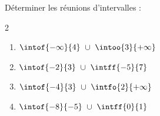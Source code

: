 \begin{exo}{}
	Déterminer les réunions d'intervalles :
	\vspace*{-2mm}\begin{multicols}{2}
	\begin{enumerate}[label=\alph*), itemsep=6pt]
		\item $\intof{-\infty}{4} ~\cup~ \intoo{3}{+\infty}$
		\item $\intof{-2}{3} ~\cup~ \intff{-5}{7}$
		\item $\intof{-4}{3} ~\cup~ \intfo{2}{+\infty}$
		\item $\intof{-8}{-5} ~\cup~ \intff{0}{1}$
	\end{enumerate}
	\end{multicols}\vspace*{-2mm}
\end{exo}
